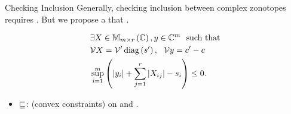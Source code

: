 \begin{frame}{Checking Inclusion}
Generally, checking inclusion between complex zonotopes requires .
But we propose a  that  .\\[0.5em]
%
{\small 
%
\begin{definition}[\eqnemph{$\tcztope{\ptemp^\pr}{\cen^\pr}{\sfact^\pr}\order\tcztope{\ptemp}{\cen}{\sfact}$}]
%
\vspace{-1em}
\begin{align*}
& \exists \tmat\in\mat{m}{r}{\compnums},\tvect\in\compnums^m~~\text{such
that}\\
& \ptemp\tmat=\ptemp^\pr\diagonal{\sfact^\pr},~~\ptemp\tvect=\cen^\pr-\cen~\\%
& \max_{i=1}^m\lt(\absolute{\tvect_i}+\sum_{j=1}^r\absolute{\tmat_{ij}}-\sfact_i\rt)\leq
0.
\end{align*}
%
\end{definition}
}
\vspace{0.3em}
\begin{minipage}{0.37\textwidth}
\begin{exampleblock}{}
\end{exampleblock}
\end{minipage}
%
\begin{minipage}{0.6\textwidth}
\begin{itemize}
\item $\sqsubseteq$:  (convex
constraints) on  and .
\end{itemize}
\end{minipage}
%
\end{frame}


